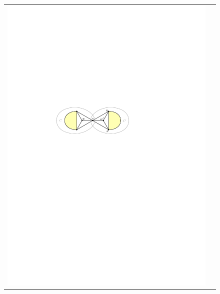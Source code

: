 \documentclass[a4paper,UKenglish,cleveref, autoref, thm-restate]{lipics-v2021}
\begin{document}
\begin{figure}[htpb]
\begin{tabular}{cc}
    \includegraphics[page=2]{figs/isolated} &

\end{tabular}
\end{figure}
\end{document}
